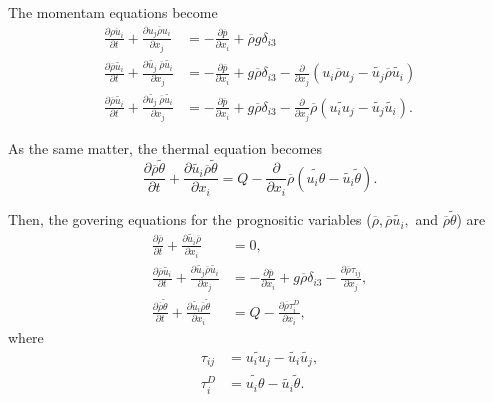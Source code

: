 The momentam equations become
\begin{align}
  \frac{\partial \overline{\rho u_i}}{\partial t} + \frac{\partial \overline{u_j\rho u_i}}{\partial x_j} &= -\frac{\partial \overline{p}}{\partial x_i} + \overline{\rho} g\delta_{i3} \\
  \frac{\partial \overline{\rho}\widetilde{u_i}}{\partial t} + \frac{\partial \widetilde{u_j}\:\overline{\rho}\widetilde{u_i}}{\partial x_j} &= -\frac{\partial \overline{p}}{\partial x_i} + g\overline{\rho} \delta_{i3}
    -\frac{\partial}{\partial x_j}\left(\overline{u_i \rho u_j} - \widetilde{u_j}\overline{\rho}\widetilde{u_i}\right) \\
  \frac{\partial \overline{\rho}\widetilde{u_i}}{\partial t} + \frac{\partial \widetilde{u_j}\:\overline{\rho}\widetilde{u_i}}{\partial x_j} &= -\frac{\partial \overline{p}}{\partial x_i} + g\overline{\rho} \delta_{i3}
    -\frac{\partial}{\partial x_j}\overline{\rho}\left(\widetilde{u_i u_j} - \widetilde{u_j}\widetilde{u_i}\right).
\end{align}


As the same matter, the thermal equation becomes
\begin{equation}
  \frac{\partial \overline{\rho}\widetilde{\theta}}{\partial t}
  + \frac{\partial \widetilde{u_i}\overline{\rho}\widetilde{\theta}}{\partial x_i}
  = Q -\frac{\partial}{\partial x_i}\overline{\rho}\left(\widetilde{u_i\theta}-\widetilde{u_i}\widetilde{\theta}\right).
\end{equation}

Then, the govering equations for the prognositic variables
($\overline{\rho}, \overline{\rho}\widetilde{u_i}, $ and $\overline{\rho}\widetilde{\theta}$) are
\begin{align}
  \frac{\partial \overline{\rho}}{\partial t}
  + \frac{\partial \widetilde{u_i}\overline{\rho}}{\partial x_i} &= 0, \\
  \frac{\partial \overline{\rho}\widetilde{u_i}}{\partial t}
  + \frac{\partial \widetilde{u_j}\overline{\rho}\widetilde{u_i}}{\partial x_j}
  &= -\frac{\partial \overline{p}}{\partial x_i} + g\overline{\rho}\delta_{i3}
  -\frac{\partial \overline{\rho}\tau_{ij}}{\partial x_j}, \\
  \frac{\partial \overline{\rho}\widetilde{\theta}}{\partial t}
  + \frac{\partial \widetilde{u_i}\overline{\rho}\widetilde{\theta}}{\partial x_i}
  &= Q -\frac{\partial \overline{\rho}\tau^D_{i}}{\partial x_i},
\end{align}
where
\begin{align}
  \tau_{ij} &= \widetilde{u_iu_j}-\widetilde{u_i}\widetilde{u_j}, \\
  \tau^D_{i} &= \widetilde{u_i\theta}-\widetilde{u_i}\widetilde{\theta}.
\end{align}


